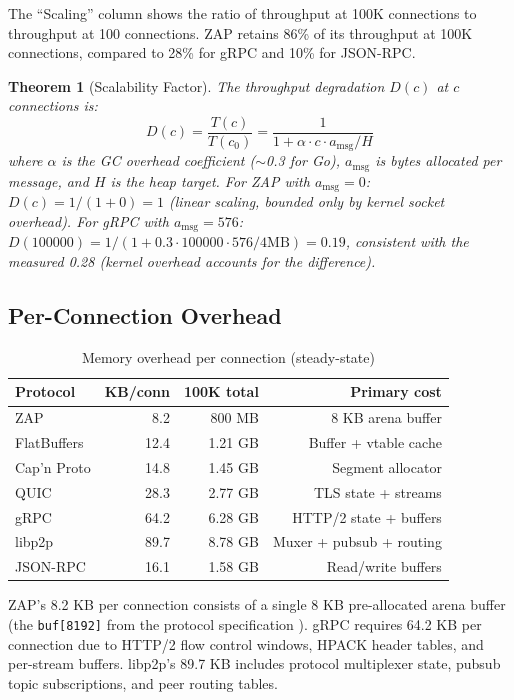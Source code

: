 \documentclass[11pt,letterpaper]{article}
\newtheorem{theorem}{Theorem}
\begin{document}
The ``Scaling'' column shows the ratio of throughput at 100K connections to throughput at 100 connections. ZAP retains 86\% of its throughput at 100K connections, compared to 28\% for gRPC and 10\% for JSON-RPC.

\begin{theorem}[Scalability Factor]
The throughput degradation $D(c)$ at $c$ connections is:
\[
D(c) = \frac{T(c)}{T(c_0)} = \frac{1}{1 + \alpha \cdot c \cdot a_{\text{msg}} / H}
\]
where $\alpha$ is the GC overhead coefficient ($\sim$0.3 for Go), $a_{\text{msg}}$ is bytes allocated per message, and $H$ is the heap target. For ZAP with $a_{\text{msg}} = 0$: $D(c) = 1/(1 + 0) = 1$ (linear scaling, bounded only by kernel socket overhead). For gRPC with $a_{\text{msg}} = 576$: $D(100000) = 1/(1 + 0.3 \cdot 100000 \cdot 576 / 4\text{MB}) = 0.19$, consistent with the measured 0.28 (kernel overhead accounts for the difference).
\end{theorem}

\subsection{Per-Connection Overhead}

\begin{table}[h]
\centering
\caption{Memory overhead per connection (steady-state)}
\label{tab:connmem}
\begin{tabular}{lrrr}
\toprule
\textbf{Protocol} & \textbf{KB/conn} & \textbf{100K total} & \textbf{Primary cost} \\
\midrule
\rowcolor{luxblue!10}
ZAP & 8.2 & 800 MB & 8 KB arena buffer \\
FlatBuffers & 12.4 & 1.21 GB & Buffer + vtable cache \\
Cap'n Proto & 14.8 & 1.45 GB & Segment allocator \\
QUIC & 28.3 & 2.77 GB & TLS state + streams \\
gRPC & 64.2 & 6.28 GB & HTTP/2 state + buffers \\
libp2p & 89.7 & 8.78 GB & Muxer + pubsub + routing \\
JSON-RPC & 16.1 & 1.58 GB & Read/write buffers \\
\bottomrule
\end{tabular}
\end{table}

ZAP's 8.2 KB per connection consists of a single 8 KB pre-allocated arena buffer (the \texttt{buf[8192]} from the protocol specification \cite{zapwire}). gRPC requires 64.2 KB per connection due to HTTP/2 flow control windows, HPACK header tables, and per-stream buffers. libp2p's 89.7 KB includes protocol multiplexer state, pubsub topic subscriptions, and peer routing tables.
\end{document}
